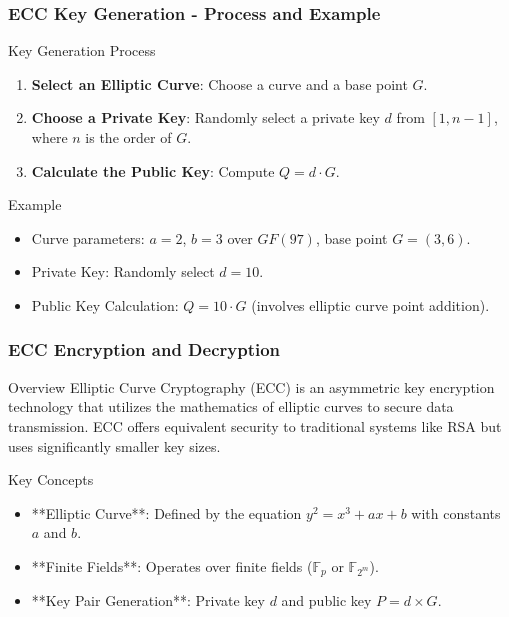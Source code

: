 \documentclass{beamer}
\begin{document}
\begin{frame}[fragile]
    \frametitle{ECC Key Generation - Process and Example}
    \begin{block}{Key Generation Process}
        \begin{enumerate}
            \item \textbf{Select an Elliptic Curve}: Choose a curve and a base point \(G\).
            \item \textbf{Choose a Private Key}: Randomly select a private key \(d\) from \([1, n-1]\), where \(n\) is the order of \(G\).
            \item \textbf{Calculate the Public Key}: Compute \(Q = d \cdot G\).
        \end{enumerate}
    \end{block}

    \begin{block}{Example}
        \begin{itemize}
            \item Curve parameters: \(a = 2\), \(b = 3\) over \(GF(97)\), base point \(G = (3, 6)\).
            \item Private Key: Randomly select \(d = 10\).
            \item Public Key Calculation: \(Q = 10 \cdot G\) (involves elliptic curve point addition).
        \end{itemize}
    \end{block}
\end{frame}

\begin{frame}[fragile]
    \frametitle{ECC Encryption and Decryption}
    \begin{block}{Overview}
        Elliptic Curve Cryptography (ECC) is an asymmetric key encryption technology that utilizes the mathematics of elliptic curves to secure data transmission. 
        ECC offers equivalent security to traditional systems like RSA but uses significantly smaller key sizes.
    \end{block}
    
    \begin{block}{Key Concepts}
        \begin{itemize}
            \item **Elliptic Curve**: Defined by the equation $y^2 = x^3 + ax + b$ with constants $a$ and $b$.
            \item **Finite Fields**: Operates over finite fields ($\mathbb{F}_p$ or $\mathbb{F}_{2^m}$).
            \item **Key Pair Generation**: Private key $d$ and public key $P = d \times G$.
        \end{itemize}
    \end{block}
\end{frame}
\end{document}
